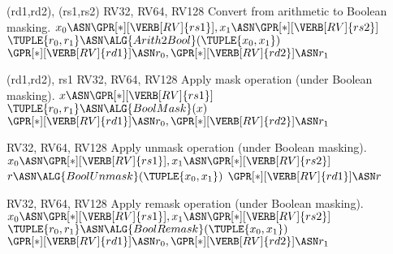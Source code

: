 


     {(rd1,rd2), (rs1,rs2)}           {RV32, RV64, RV128}{
  Convert from arithmetic to Boolean    masking.
}{
  $x_0 \ASN \GPR[*][{\VERB[RV]{rs1}}], x_1 \ASN \GPR[*][{\VERB[RV]{rs2}}]$ \;
  $\TUPLE{ r_0, r_1 } \ASN \ALG{Arith2Bool}( \TUPLE{ x_0, x_1 } )$ \;
  $\GPR[*][{\VERB[RV]{rd1}}] \ASN r_0, \GPR[*][{\VERB[RV]{rd2}}] \ASN r_1$ \;
}

  {(rd1,rd2), rs1}                 {RV32, RV64, RV128}{
  Apply         mask operation 
  (under Boolean    masking).
}{
  $x   \ASN \GPR[*][{\VERB[RV]{rs1}}]                                     $ \;
  $\TUPLE{ r_0, r_1 } \ASN \ALG {BoolMask}  (         x          )$ \;
  $\GPR[*][{\VERB[RV]{rd1}}] \ASN r_0, \GPR[*][{\VERB[RV]{rd2}}] \ASN r_1$ \;    
}


                 {RV32, RV64, RV128}{
  Apply       unmask operation 
  (under Boolean    masking).
}{
  $x_0 \ASN \GPR[*][{\VERB[RV]{rs1}}], x_1 \ASN \GPR[*][{\VERB[RV]{rs2}}]$ \;
  $        r          \ASN \ALG {BoolUnmask}( \TUPLE{ x_0, x_1 } )$ \;
  $\GPR[*][{\VERB[RV]{rd1}}] \ASN r                                       $ \;    
}


           {RV32, RV64, RV128}{
  Apply       remask operation 
  (under Boolean    masking).
}{
  $x_0 \ASN \GPR[*][{\VERB[RV]{rs1}}], x_1 \ASN \GPR[*][{\VERB[RV]{rs2}}]$ \;
  $\TUPLE{ r_0, r_1 } \ASN \ALG {BoolRemask}( \TUPLE{ x_0, x_1 } )$ \;
  $\GPR[*][{\VERB[RV]{rd1}}] \ASN r_0, \GPR[*][{\VERB[RV]{rd2}}] \ASN r_1$ \;  
}

